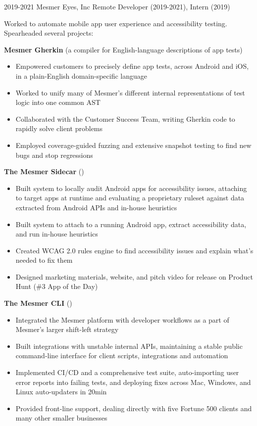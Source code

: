 \documentclass[letterpaper,10pt]{article}
\begin{document}
\work
{2019-2021}
{Mesmer Eyes, Inc}
{Remote}
{Developer (2019-2021), Intern (2019)}
{
	Worked to automate mobile app user experience and accessibility testing. Spearheaded several projects:

	\vbeat
	\textbf{Mesmer Gherkin} (a compiler for English-language descriptions of app tests)

	\begin{itemize}
	\item Empowered customers to precisely define app tests, across Android and iOS, in a plain-English domain-specific language
	\item Worked to unify many of Mesmer's different internal representations of test logic into one common AST
	\item Collaborated with the Customer Success Team, writing Gherkin code to rapidly solve client problems
	\item Employed coverage-guided fuzzing and extensive snapshot testing to find new bugs and stop regressions
	\end{itemize}

	\textbf{The Mesmer Sidecar} ()

	\begin{itemize}
	\item Built system to locally audit Android apps for accessibility issues, attaching to target apps at runtime and evaluating a proprietary ruleset against data extracted from Android APIs and in-house heuristics
	\item Built system to attach to a running Android app, extract accessibility data, and run in-house heuristics
	\item Created WCAG 2.0 rules engine to find accessibility issues and explain what's needed to fix them
	\item Designed marketing materials, website, and pitch video for release on Product Hunt (\#3 App of the Day)
	\end{itemize}

	\textbf{The Mesmer CLI} ()

	\begin{itemize}
	\item Integrated the Mesmer platform with developer workflows as a part of Mesmer's larger shift-left strategy
	\item Built integrations with unstable internal APIs, maintaining a stable public command-line interface for client scripts, integrations and automation
	\item Implemented CI/CD and a comprehensive test suite, auto-importing user error reports into failing tests, and deploying fixes across Mac, Windows, and Linux auto-updaters in 20min
	\item Provided front-line support, dealing directly with five Fortune 500 clients and many other smaller businesses
	\end{itemize}
}
\end{document}
